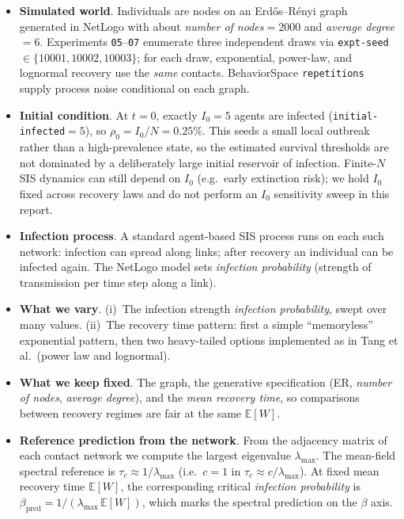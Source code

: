 \documentclass[11pt,a4paper]{article}
\begin{document}
\begin{itemize}[leftmargin=*]
  \item \textbf{Simulated world}. Individuals are nodes on an Erd\H{o}s--R\'enyi graph~\cite{ErdosRenyi1959} generated in NetLogo with about \emph{number of nodes}${}=2000$ and \emph{average degree}${}=6$. Experiments \texttt{05}--\texttt{07} enumerate three independent draws via \texttt{expt-seed}${}\in\{10001,10002,10003\}$; for each draw, exponential, power-law, and lognormal recovery use the \emph{same} contacts. BehaviorSpace \texttt{repetitions} supply process noise conditional on each graph.

  \item \textbf{Initial condition}. At $t{=}0$, exactly $I_0{=}5$ agents are infected (\texttt{initial-infected}${}=5$), so $\rho_0=I_0/N=0.25\%$. This seeds a small local outbreak rather than a high-prevalence state, so the estimated survival thresholds are not dominated by a deliberately large initial reservoir of infection. Finite-$N$ SIS dynamics can still depend on $I_0$ (e.g.\ early extinction risk); we hold $I_0$ fixed across recovery laws and do not perform an $I_0$ sensitivity sweep in this report.

  \item \textbf{Infection process}. A standard agent-based SIS process runs on each such network: infection can spread along links; after recovery an individual can be infected again. The NetLogo model sets \emph{infection probability} (strength of transmission per time step along a link).

  \item \textbf{What we vary}. (i)~The infection strength \emph{infection probability}, swept over many values. (ii)~The recovery time pattern: first a simple ``memoryless'' exponential pattern, then two heavy-tailed options implemented as in Tang et al.\ (power law and lognormal).

  \item \textbf{What we keep fixed}. The graph, the generative specification (ER, \emph{number of nodes}, \emph{average degree}), and the \emph{mean recovery time}, so comparisons between recovery regimes are fair at the same $\mathbb{E}[W]$.

  \item \textbf{Reference prediction from the network}. From the adjacency matrix of each contact network we compute the largest eigenvalue $\lambda_{\max}$. The mean-field spectral reference is $\tau_c \approx 1/\lambda_{\max}$ (i.e.\ $c=1$ in $\tau_c \approx c/\lambda_{\max}$). At fixed mean recovery time $\mathbb{E}[W]$, the corresponding critical \emph{infection probability} is $\beta_{\mathrm{pred}} = 1/(\lambda_{\max}\,\mathbb{E}[W])$, which marks the spectral prediction on the $\beta$ axis.
\end{itemize}
\end{document}
